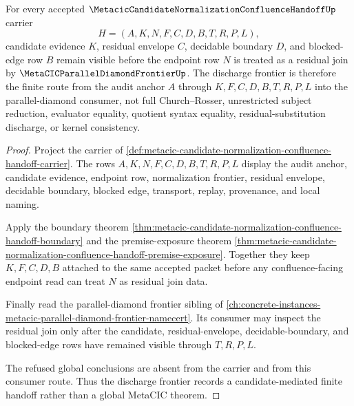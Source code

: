 \begin{theorem}
\label{thm:metacic-candidate-residual-budget-discharge-frontier}
For every accepted $\MetacicCandidateNormalizationConfluenceHandoffUp$ carrier
$$
H=(A,K,N,F,C,D,B,T,R,P,L),
$$
candidate evidence $K$, residual envelope $C$, decidable boundary $D$, and blocked-edge row $B$ remain visible before the endpoint row $N$ is treated as a residual join by $\MetaCICParallelDiamondFrontierUp$. The discharge frontier is therefore the finite route from the audit anchor $A$ through $K,F,C,D,B,T,R,P,L$ into the parallel-diamond consumer, not full Church--Rosser, unrestricted subject reduction, evaluator equality, quotient syntax equality, residual-substitution discharge, or kernel consistency.
\end{theorem}
\begin{proof}
Project the carrier of \autoref{def:metacic-candidate-normalization-confluence-handoff-carrier}. The rows $A,K,N,F,C,D,B,T,R,P,L$ display the audit anchor, candidate evidence, endpoint row, normalization frontier, residual envelope, decidable boundary, blocked edge, transport, replay, provenance, and local naming.

Apply the boundary theorem \autoref{thm:metacic-candidate-normalization-confluence-handoff-boundary} and the premise-exposure theorem \autoref{thm:metacic-candidate-normalization-confluence-handoff-premise-exposure}. Together they keep $K,F,C,D,B$ attached to the same accepted packet before any confluence-facing endpoint read can treat $N$ as residual join data.

Finally read the parallel-diamond frontier sibling of \autoref{ch:concrete-instances-metacic-parallel-diamond-frontier-namecert}. Its consumer may inspect the residual join only after the candidate, residual-envelope, decidable-boundary, and blocked-edge rows have remained visible through $T,R,P,L$.

The refused global conclusions are absent from the carrier and from this consumer route. Thus the discharge frontier records a candidate-mediated finite handoff rather than a global MetaCIC theorem.
\end{proof}
